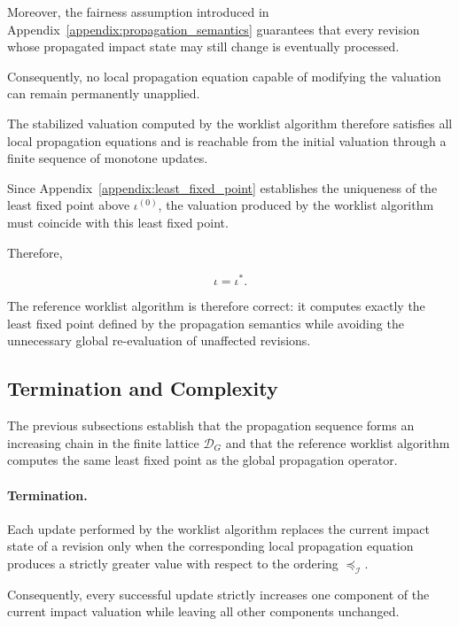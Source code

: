 \documentclass[10pt]{article}
\begin{document}
Moreover, the fairness assumption introduced in
Appendix~\ref{appendix:propagation_semantics}
guarantees that every revision whose propagated impact state may still change
is eventually processed.

Consequently, no local propagation equation capable of modifying the valuation
can remain permanently unapplied.

The stabilized valuation computed by the worklist algorithm therefore satisfies
all local propagation equations and is reachable from the initial valuation
through a finite sequence of monotone updates.

Since Appendix~\ref{appendix:least_fixed_point}
establishes the uniqueness of the least fixed point above
$\iota^{(0)}$,
the valuation produced by the worklist algorithm must coincide with this least
fixed point.

Therefore,

\begin{equation}
	\label{eq:worklist_correctness}
	\iota
	=
	\iota^{*}.
\end{equation}

The reference worklist algorithm is therefore correct: it computes exactly the
least fixed point defined by the propagation semantics while avoiding the
unnecessary global re-evaluation of unaffected revisions.

\subsection{Termination and Complexity}

The previous subsections establish that the propagation sequence forms an
increasing chain in the finite lattice
$\mathcal D_G$
and that the reference worklist algorithm computes the same least fixed point
as the global propagation operator.

\paragraph{Termination.}

Each update performed by the worklist algorithm replaces the current impact
state of a revision only when the corresponding local propagation equation
produces a strictly greater value with respect to the ordering
$\preceq_{\mathcal I}$.

Consequently, every successful update strictly increases one component of the
current impact valuation while leaving all other components unchanged.
\end{document}
